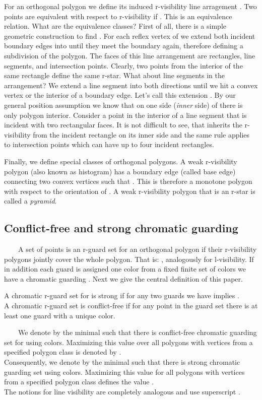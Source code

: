 \documentclass[a4paper,USenglish,numberwithinsect]{lipics}
\theoremstyle{plain}
\begin{document}
For an orthogonal polygon   we define its induced  r-visibility line
arragement .
 Two points  are equivalent with respect to r-visibility if
.
This is an equivalence relation. What are the equivalence classes? 
First of all, there is a simple geometric construction to find .
For each reflex vertex of  we extend both incident boundary edges
into   until they meet the boundary again, therefore
defining a subdivision of the polygon. The faces of this line
arrangement are rectangles, line segments, and intersection points.
Clearly, two points from the interior of the same rectangle define the
same r-star. What about line segments in the arrangement? We extend a
line segment  into both directions until we hit a convex vertex or
the interior of a boundary edge. Let's call this extension . By our
general position assumption we know that on one side
 ({\it inner} side) of  there is only polygon interior.  Consider a
point  in the interior of a line segment that is incident with two
rectangular faces. It is not difficult to see, that     inherits the
r-visibility from the incident rectangle on its inner side and the same
rule applies to intersection points which can have up to four incident
rectangles.

Finally, we define special classes of orthogonal polygons. A weak
r-visibility polygon (also known as histogram) has a boundary edge 
(called base edge) connecting two convex vertices such that
. This is therefore a monotone polygon with respect to  the
orientation of . A weak r-visibility polygon that is an r-star is
called a {\it pyramid}.   


\subsection{Conflict-free and strong chromatic guarding}
\ \ \ \ A set  of points is an r-guard set for an orthogonal polygon  if their r-visibility polygons
jointly  cover the whole polygon. That is: , analogously for l-visibility. If in addition  each guard
 is assigned one color  from a fixed finite set of
colors  we have a chromatic guarding .
Next we give the central
definition of this paper.

\begin{definition} A chromatic r-guard set  for  is  strong
 if for any two  guards  we have
 implies .\\
 A chromatic r-guard set   is  conflict-free   if for any
point  in the guard set  there is at least one
guard with a unique color. 
\end{definition}
\ \ \ \ We denote by  the minimal  such that there is
conflict-free chromatic guarding set for  using  colors. Maximizing this value
over  all polygons with  vertices from  a specified polygon class is
denoted by .\\
Consequently, we  denote by  the minimal  such that there is
strong chromatic guarding set using  colors. Maximizing this value
for all polygons with  vertices from  a specified polygon class defines
the value  .\\
The notions for line visibility are completely analogous and use superscript .
\end{document}
